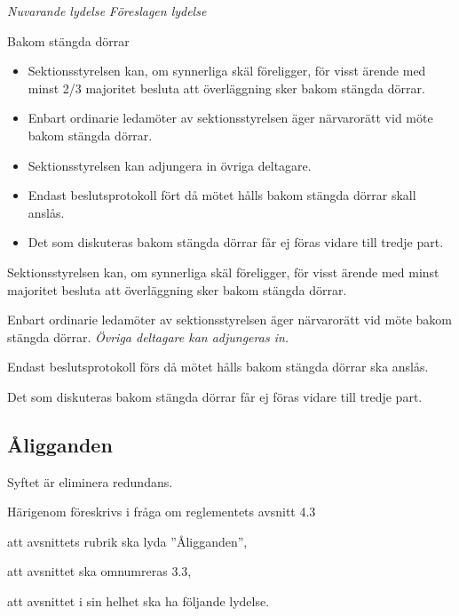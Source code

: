 \documentclass{article}
\newenvironment{lydelse}
    {\begin{paracol}{2}%
        \emph{Nuvarande lydelse}%
        \switchcolumn%
        \emph{Föreslagen lydelse}%
    \end{paracol}%
    \begin{enumerate}[label=\thesubsection.\arabic*]%
    \begin{paracol}{2}%
    }{\end{paracol}\end{enumerate}}
\begin{document}
\begin{lydelse}
    \setcounter{section}{4}
    \setcounter{enumi}{9}
    \item Bakom stängda dörrar
    \begin{itemize}
		\item Sektionsstyrelsen kan, om synnerliga skäl föreligger, för visst ärende med minst 2/3 majoritet besluta att överläggning sker bakom stängda dörrar.
		\item Enbart ordinarie ledamöter av sektionsstyrelsen äger närvarorätt vid möte bakom stängda dörrar.
		\item Sektionsstyrelsen kan adjungera in övriga deltagare.
		\item Endast beslutsprotokoll fört då mötet hålls bakom stängda dörrar skall anslås.
		\item Det som diskuteras bakom stängda dörrar får ej föras vidare till tredje part. 
	\end{itemize}
    \setcounter{section}{3}
    \switchcolumn
    
    \vspace{4ex}
    \item Sektionsstyrelsen kan, om synnerliga skäl föreligger, för visst ärende med minst  majoritet besluta att överläggning sker bakom stängda dörrar.

    \item Enbart ordinarie ledamöter av sektionsstyrelsen äger närvarorätt vid möte bakom stängda dörrar.
    \emph{Övriga deltagare kan adjungeras in.}
    \label{R:BSDAdjungering}
    
    \item[]
    
    \vspace{3ex}
    \item Endast beslutsprotokoll förs då mötet hålls bakom stängda dörrar ska anslås. %
    
    \item Det som diskuteras bakom stängda dörrar får ej föras vidare till tredje part. 
\end{lydelse}


\subsection{Åligganden}
Syftet är eliminera redundans.

Härigenom föreskrivs i fråga om reglementets avsnitt 4.3

\begin{dels}
    \item att avsnittets rubrik ska lyda ''Åligganden'',
    \item att avsnittet ska omnumreras 3.3,
    \item att avsnittet i sin helhet ska ha följande lydelse.
\end{dels}
\end{document}
